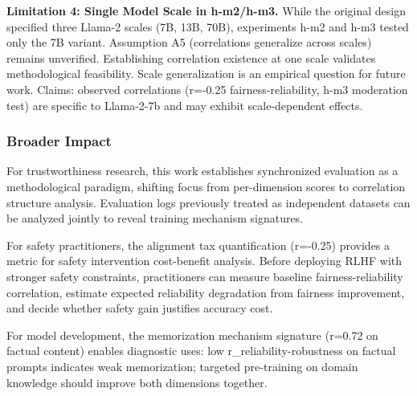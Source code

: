 \textbf{Limitation 4: Single Model Scale in h-m2/h-m3.} While the original design specified three Llama-2 scales (7B, 13B, 70B), experiments h-m2 and h-m3 tested only the 7B variant. Assumption A5 (correlations generalize across scales) remains unverified. Establishing correlation existence at one scale validates methodological feasibility. Scale generalization is an empirical question for future work. Claims: observed correlations (r=-0.25 fairness-reliability, h-m3 moderation test) are specific to Llama-2-7b and may exhibit scale-dependent effects.

\subsubsection{Broader Impact}

For trustworthiness research, this work establishes synchronized evaluation as a methodological paradigm, shifting focus from per-dimension scores to correlation structure analysis. Evaluation logs previously treated as independent datasets can be analyzed jointly to reveal training mechanism signatures.

For safety practitioners, the alignment tax quantification (r=-0.25) provides a metric for safety intervention cost-benefit analysis. Before deploying RLHF with stronger safety constraints, practitioners can measure baseline fairness-reliability correlation, estimate expected reliability degradation from fairness improvement, and decide whether safety gain justifies accuracy cost.

For model development, the memorization mechanism signature (r=0.72 on factual content) enables diagnostic uses: low r\_reliability-robustness on factual prompts indicates weak memorization; targeted pre-training on domain knowledge should improve both dimensions together.
